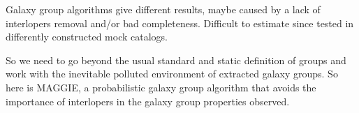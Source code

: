 Galaxy group algorithms give different results, maybe caused by
a lack of interlopers removal and/or bad completeness. Difficult to estimate
since tested in differently constructed mock catalogs. 

So we need to go beyond the usual standard and static definition of groups
and work with the inevitable polluted environment of extracted galaxy
groups. So here is MAGGIE, a probabilistic galaxy group algorithm that
avoids the importance of interlopers in the galaxy group properties
observed.
